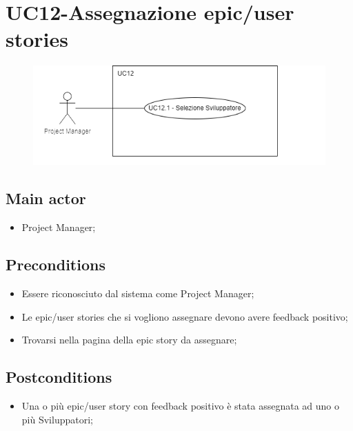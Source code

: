 \documentclass{article}
\begin{document}
\section{UC12-Assegnazione epic/user stories}
    \begin{figure}[h]
      \centering
      \includegraphics{documenti/imgUML/UC12.png}
      \label{fig:immagine}
    \end{figure}

    \subsection*{Main actor}
    \begin{itemize}
        \item Project Manager;
    \end{itemize}
    
    \subsection*{Preconditions}
        \begin{itemize}
            \item Essere riconosciuto dal sistema come Project Manager;
            \item Le epic/user stories che si vogliono assegnare devono avere feedback positivo;
            \item Trovarsi nella pagina della epic story da assegnare;
        \end{itemize}
        
    \subsection*{Postconditions}
        \begin{itemize}
            \item Una o più epic/user story con feedback positivo è stata assegnata ad uno o più Sviluppatori;
        \end{itemize}
    
\end{document}
